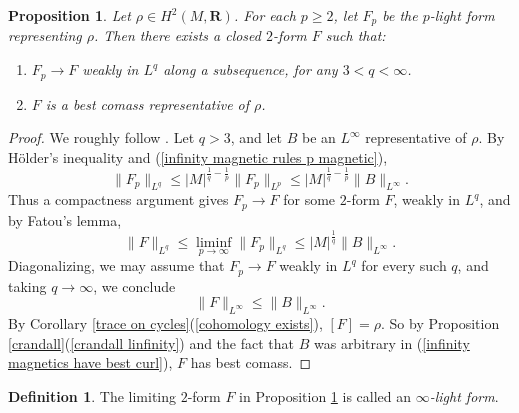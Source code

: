 \documentclass[reqno,11pt]{amsart}
\newcommand{\RR}{\mathbf{R}}
\newcommand{\dfn}[1]{\emph{#1}\index{#1}}
\newtheorem{proposition}[theorem]{Proposition}
\theoremstyle{definition}
\newtheorem{definition}[theorem]{Definition}
\numberwithin{equation}{section}
\begin{document}
\begin{proposition}\label{existence infinity}
Let $\rho \in H^2(M, \RR)$.
For each $p \geq 2$, let $F_p$ be the $p$-light form representing $\rho$. Then there exists a closed $2$-form $F$ such that:
\begin{enumerate}
\item $F_p \to F$ weakly in $L^q$ along a subsequence, for any $3 < q < \infty$.
\item $F$ is a best comass representative of $\rho$.
\end{enumerate}
\end{proposition}
\begin{proof}
We roughly follow \cite[\S3]{Lindqvist14}.
Let $q > 3$, and let $B$ be an $L^\infty$ representative of $\rho$.
By H\"older's inequality and (\ref{infinity magnetic rules p magnetic}),
\begin{equation}\label{uniform bounds in p by best curl}
	\|F_p\|_{L^q} \leq |M|^{\frac{1}{q} - \frac{1}{p}} \|F_p\|_{L^p} \leq |M|^{\frac{1}{q} - \frac{1}{p}} \|B\|_{L^\infty}.
\end{equation}
Thus a compactness argument gives $F_p \to F$ for some $2$-form $F$, weakly in $L^q$, and by Fatou's lemma, 
$$\|F\|_{L^q} \leq \liminf_{p \to \infty} \|F_p\|_{L^q} \leq |M|^{\frac{1}{q}} \|B\|_{L^\infty}.$$
Diagonalizing, we may assume that $F_p \to F$ weakly in $L^q$ for every such $q$, and taking $q \to \infty$, we conclude 
\begin{equation}\label{infinity magnetics have best curl}
	\|F\|_{L^\infty} \leq \|B\|_{L^\infty}.
\end{equation}
By Corollary \ref{trace on cycles}(\ref{cohomology exists}), $[F] = \rho$.
So by Proposition \ref{crandall}(\ref{crandall linfinity}) and the fact that $B$ was arbitrary in (\ref{infinity magnetics have best curl}), $F$ has best comass.
\end{proof}

\begin{definition}
The limiting $2$-form $F$ in Proposition \ref{existence infinity} is called an \dfn{$\infty$-light form}.
\end{definition}
\end{document}
